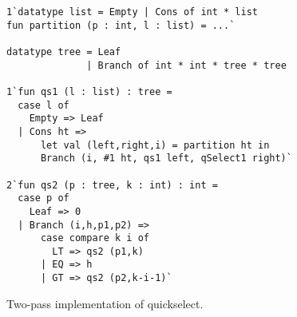 \begin{figure}
\begin{lstlisting}
1`datatype list = Empty | Cons of int * list
fun partition (p : int, l : list) = ...`

datatype tree = Leaf
              | Branch of int * int * tree * tree

1`fun qs1 (l : list) : tree =
  case l of
    Empty => Leaf
  | Cons ht => 
      let val (left,right,i) = partition ht in
      Branch (i, #1 ht, qs1 left, qSelect1 right)`

2`fun qs2 (p : tree, k : int) : int = 
  case p of
    Leaf => 0
  | Branch (i,h,p1,p2) => 
      case compare k i of
        LT => qs2 (p1,k)
      | EQ => h
      | GT => qs2 (p2,k-i-1)`
\end{lstlisting}
\caption{Two-pass implementation of quickselect.}
\label{fig:qs-split}
\end{figure}

